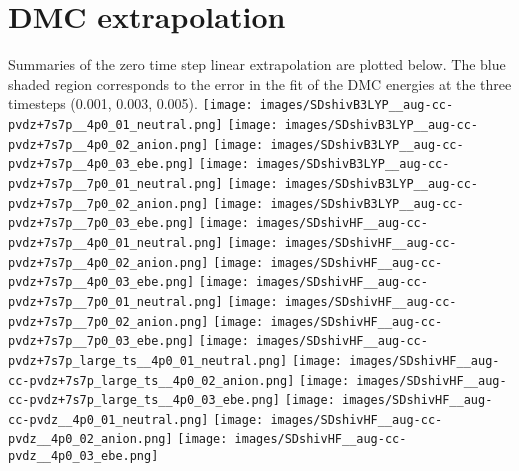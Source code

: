 \section{DMC extrapolation}
Summaries of the zero time step linear extrapolation are plotted below. The blue shaded region corresponds to the error in the fit of the DMC energies at the three timesteps (0.001, 0.003, 0.005).
\newpage
\texttt{[image: images/SDshivB3LYP\_\_aug-cc-pvdz+7s7p\_\_4p0\_01\_neutral.png]}
\texttt{[image: images/SDshivB3LYP\_\_aug-cc-pvdz+7s7p\_\_4p0\_02\_anion.png]}
\texttt{[image: images/SDshivB3LYP\_\_aug-cc-pvdz+7s7p\_\_4p0\_03\_ebe.png]}
\texttt{[image: images/SDshivB3LYP\_\_aug-cc-pvdz+7s7p\_\_7p0\_01\_neutral.png]}
\texttt{[image: images/SDshivB3LYP\_\_aug-cc-pvdz+7s7p\_\_7p0\_02\_anion.png]}
\texttt{[image: images/SDshivB3LYP\_\_aug-cc-pvdz+7s7p\_\_7p0\_03\_ebe.png]}
\texttt{[image: images/SDshivHF\_\_aug-cc-pvdz+7s7p\_\_4p0\_01\_neutral.png]}
\texttt{[image: images/SDshivHF\_\_aug-cc-pvdz+7s7p\_\_4p0\_02\_anion.png]}
\texttt{[image: images/SDshivHF\_\_aug-cc-pvdz+7s7p\_\_4p0\_03\_ebe.png]}
\texttt{[image: images/SDshivHF\_\_aug-cc-pvdz+7s7p\_\_7p0\_01\_neutral.png]}
\texttt{[image: images/SDshivHF\_\_aug-cc-pvdz+7s7p\_\_7p0\_02\_anion.png]}
\texttt{[image: images/SDshivHF\_\_aug-cc-pvdz+7s7p\_\_7p0\_03\_ebe.png]}
\texttt{[image: images/SDshivHF\_\_aug-cc-pvdz+7s7p\_large\_ts\_\_4p0\_01\_neutral.png]}
\texttt{[image: images/SDshivHF\_\_aug-cc-pvdz+7s7p\_large\_ts\_\_4p0\_02\_anion.png]}
\texttt{[image: images/SDshivHF\_\_aug-cc-pvdz+7s7p\_large\_ts\_\_4p0\_03\_ebe.png]}
\texttt{[image: images/SDshivHF\_\_aug-cc-pvdz\_\_4p0\_01\_neutral.png]}
\texttt{[image: images/SDshivHF\_\_aug-cc-pvdz\_\_4p0\_02\_anion.png]}
\texttt{[image: images/SDshivHF\_\_aug-cc-pvdz\_\_4p0\_03\_ebe.png]}
